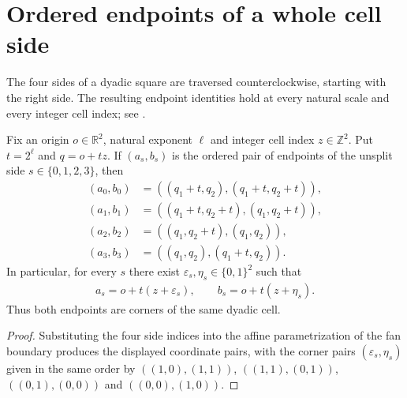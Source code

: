 \section{Ordered endpoints of a whole cell side}
\label{sec:area_law_side_endpoints}

The four sides of a dyadic square are traversed counterclockwise, starting
with the right side. The resulting endpoint identities hold at every
natural scale and every integer cell index; see
\cite[Section~11]{OpenAI2026AreaLaw}.


\begin{lemma}
    \label{thm:area_law_unsplit_side_endpoints}
    \leanok
    Fix an origin $o\in\mathbb R^2$, natural exponent $\ell$ and
    integer cell index $z\in\mathbb Z^2$. Put $t=2^\ell$ and
    $q=o+tz$. If $(a_s,b_s)$ is the ordered pair of endpoints of
    the unsplit side $s\in\{0,1,2,3\}$, then
    \begin{align}
        (a_0,b_0) & =((q_1+t,q_2),(q_1+t,q_2+t)), \\
        (a_1,b_1) & =((q_1+t,q_2+t),(q_1,q_2+t)), \\
        (a_2,b_2) & =((q_1,q_2+t),(q_1,q_2)),     \\
        (a_3,b_3) & =((q_1,q_2),(q_1+t,q_2)).
    \end{align}
    In particular, for every $s$ there exist
    $\varepsilon_s,\eta_s\in\{0,1\}^2$ such that
    \begin{align}
        a_s=o+t(z+\varepsilon_s),\qquad
        b_s=o+t(z+\eta_s).
    \end{align}
    Thus both endpoints are corners of the same dyadic cell.
\end{lemma}
\begin{proof}\leanok
    Substituting the four side indices into the affine parametrization
    of the fan boundary produces the displayed coordinate pairs, with the
    corner pairs $(\varepsilon_s,\eta_s)$ given in the same order by
    $((1,0),(1,1))$, $((1,1),(0,1))$,
    $((0,1),(0,0))$ and $((0,0),(1,0))$.
\end{proof}
